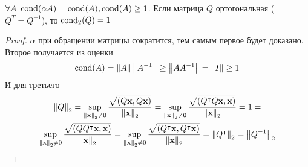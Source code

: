 \begin{lemma}
  $\forall A \ \operatorname{cond}(\alpha A) = \operatorname{cond}(A), \operatorname{cond}(A) \ge 1$. Если матрица $Q$ ортогональная ($Q^T=Q^{-1}$), то $\operatorname{cond}_2(Q) = 1$
  \begin{proof}
    $\alpha$ при обращении матрицы сократится, тем самым первое будет доказано. Второе получается из оценки
    $$
      \operatorname{cond}(A) = \left\lVert A\right\rVert\left\lVert A^{-1}\right\rVert \ge \left\lVert A A^{-1}\right\rVert = \left\lVert I\right\rVert \ge 1
    $$
    И для третьего
    \begin{multline*}
      \left\lVert Q\right\rVert_2 = \sup_{\left\lVert\mathbf{x}\right\rVert_{2} \neq 0} \frac{\sqrt{(Q\mathbf{x}, Q\mathbf{x})}}{\left\lVert\mathbf{x}\right\rVert_{2}} =
      \sup_{\left\lVert\mathbf{x}\right\rVert_{2} \neq 0} \frac{\sqrt{(Q^\intercal Q\mathbf{x}, \mathbf{x})}}{\left\lVert\mathbf{x}\right\rVert_{2}} = 1 = \\
      \sup_{\left\lVert\mathbf{x}\right\rVert_{2} \neq 0} \frac{\sqrt{(Q Q^\intercal \mathbf{x}, \mathbf{x})}}{\left\lVert\mathbf{x}\right\rVert_{2}} =
      \sup_{\left\lVert\mathbf{x}\right\rVert_{2} \neq 0} \frac{\sqrt{( Q^\intercal \mathbf{x},Q^\intercal \mathbf{x})}}{\left\lVert\mathbf{x}\right\rVert_{2}} =
      \left\lVert Q^\intercal\right\rVert_2 =
      \left\lVert Q^{-1}\right\rVert_2
    \end{multline*}
  \end{proof}
\end{lemma}

